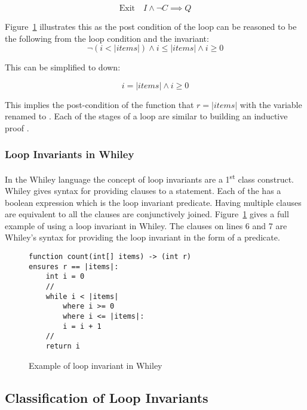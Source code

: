 $$\text{Exit} \quad I \wedge \neg{C} \implies Q$$

Figure~\ref{lst:whiley-inv} illustrates this as the
post condition of the loop can be reasoned to be the following
from the loop condition and the invariant:
$$\neg{ ( i < |items| ) } \wedge i \leq |items| \wedge i \geq 0$$

This can be simplified to down:

$$ i = |items| \wedge i \geq 0$$

This implies the post-condition of the function that $r = |items|$ with
the variable  renamed to .
Each of the stages of a loop are similar to building an inductive proof \cite{invarints-classifiction}.

\subsubsection{Loop Invariants in Whiley}

In the Whiley language the concept of loop invariants are a 1\textsuperscript{st} class
construct.
Whiley gives syntax for providing  clauses to a 
statement.
Each of the  has a boolean expression which is the loop
invariant predicate.
Having multiple  clauses are equivalent to all the clauses are
conjunctively joined.
Figure~\ref{lst:whiley-inv} gives a full example of using a loop invariant
in Whiley. The  clauses on lines 6 and 7 are Whiley's syntax for
providing the loop invariant in the form of a predicate.

\begin{figure}[ht]
\begin{lstlisting}
function count(int[] items) -> (int r)
ensures r == |items|:
    int i = 0
    //
    while i < |items|
        where i >= 0
        where i <= |items|:
        i = i + 1
    //
    return i
\end{lstlisting}
    \label{lst:whiley-inv}
    \caption{Example of loop invariant in Whiley}
\end{figure}

\subsection{Classification of Loop Invariants}

